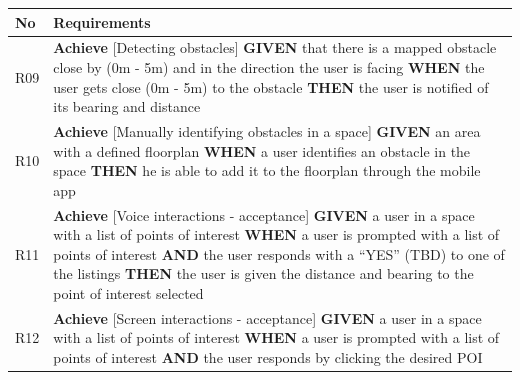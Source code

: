 \documentclass[prodmode,acmtosem]{acmsmall} %
\begin{document}
\begin{center}
\def\arraystretch{1.5}
\begin{tabularx}{\textwidth}{| p{1.5em} | X |} 
 \hline
 
No & Requirements \\
 \hline
 R09 & 
 		\textbf{Achieve} [Detecting obstacles]\newline\newline
 		\textbf{GIVEN} that there is a mapped obstacle close by (0m - 5m) and in the direction the user is facing\newline
		\textbf{WHEN} the user gets close (0m - 5m) to the obstacle\newline
		\textbf{THEN} the user is notified of its bearing and distance  \\  
 \hline
 R10 & 
 		\textbf{Achieve} [Manually identifying obstacles in a space]\newline\newline
 		\textbf{GIVEN} an area with a defined floorplan\newline
		\textbf{WHEN} a user identifies an obstacle in the space\newline
		\textbf{THEN} he is able to add it to the floorplan through the mobile app \\  
 \hline
 R11 & 
 		\textbf{Achieve} [Voice interactions - acceptance]\newline\newline
 		\textbf{GIVEN} a user in a space with a list of points of interest\newline
		\textbf{WHEN} a user is prompted with a list of points of interest\newline
		\textbf{AND} the user responds with a “YES” (TBD) to one of the listings\newline
		\textbf{THEN} the user is given the distance and bearing to the point of interest selected \\  
 \hline
 R12 & 
	 	\textbf{Achieve} [Screen interactions - acceptance]\newline\newline
 		\textbf{GIVEN} a user in a space with a list of points of interest\newline
		\textbf{WHEN} a user is prompted with a list of points of interest\newline
		\textbf{AND} the user responds by clicking the desired POI\newline

\end{tabularx}
\end{center}
\end{document}
